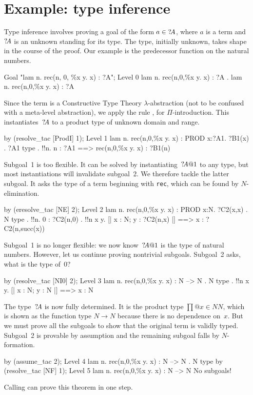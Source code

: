 \section{Example: type inference}
Type inference involves proving a goal of the form $a\in{?\!A}$, where $a$
is a term and ${?\!A}$ is an unknown standing for its type.  The type,
initially
unknown, takes shape in the course of the proof.  Our example is the
predecessor function on the natural numbers.
\begin{ttbox}
Goal "lam n. rec(n, 0, \%x y. x) : ?A";
{\out Level 0}
{\out lam n. rec(n,0,\%x y. x) : ?A}
{. lam n. rec(n,0,\%x y. x) : ?A}
\end{ttbox}
Since the term is a Constructive Type Theory $\lambda$-abstraction (not to
be confused with a meta-level abstraction), we apply the rule
, for $\Pi$-introduction.  This instantiates~${?\!A}$ to a
product type of unknown domain and range.
\begin{ttbox}
by (resolve_tac [ProdI] 1);
{\out Level 1}
{\out lam n. rec(n,0,\%x y. x) : PROD x:?A1. ?B1(x)}
{. ?A1 type}
{. !!n. n : ?A1 ==> rec(n,0,\%x y. x) : ?B1(n)}
\end{ttbox}
Subgoal~1 is too flexible.  It can be solved by instantiating~${?\!A@1}$
to any type, but most instantiations will invalidate subgoal~2.  We
therefore tackle the latter subgoal.  It asks the type of a term beginning
with {\tt rec}, which can be found by $N$-elimination.%
\begin{ttbox}
by (eresolve_tac [NE] 2);
{\out Level 2}
{\out lam n. rec(n,0,\%x y. x) : PROD x:N. ?C2(x,x)}
{. N type}
{. !!n. 0 : ?C2(n,0)}
{. !!n x y. [| x : N; y : ?C2(n,x) |] ==> x : ?C2(n,succ(x))}
\end{ttbox}
Subgoal~1 is no longer flexible: we now know~${?\!A@1}$ is the type of
natural numbers.  However, let us continue proving nontrivial subgoals.
Subgoal~2 asks, what is the type of~0?
\begin{ttbox}
by (resolve_tac [NI0] 2);
{\out Level 3}
{\out lam n. rec(n,0,\%x y. x) : N --> N}
{. N type}
{. !!n x y. [| x : N; y : N |] ==> x : N}
\end{ttbox}
The type~${?\!A}$ is now fully determined.  It is the product type
$\prod@{x\in N}N$, which is shown as the function type $N\to N$ because
there is no dependence on~$x$.  But we must prove all the subgoals to show
that the original term is validly typed.  Subgoal~2 is provable by
assumption and the remaining subgoal falls by $N$-formation.%
\begin{ttbox}
by (assume_tac 2);
{\out Level 4}
{\out lam n. rec(n,0,\%x y. x) : N --> N}
{. N type}
\ttbreak
by (resolve_tac [NF] 1);
{\out Level 5}
{\out lam n. rec(n,0,\%x y. x) : N --> N}
{\out No subgoals!}
\end{ttbox}
Calling  can prove this theorem in one step.

